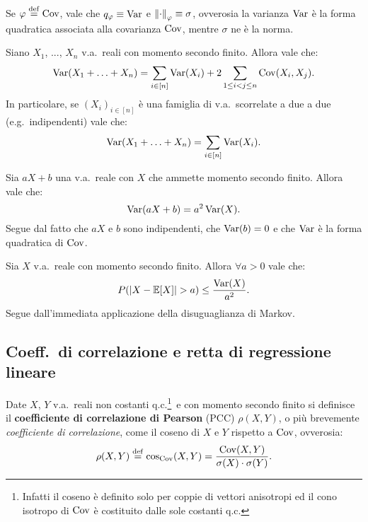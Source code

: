\begin{multicols*}{2}
\begin{remark}
    Se $\varphi \overset{\mathrm{def}}{=} \operatorname{Cov}$, vale che $q_\varphi \equiv \operatorname{Var}$ e $\left\lVert \cdot \right\rVert_\varphi \equiv \sigma$,
    ovverosia la varianza $\operatorname{Var}$ è la forma quadratica associata alla covarianza $\operatorname{Cov}$,
    mentre $\sigma$ ne è la norma.
\end{remark}

\begin{lemma}
    Siano $X_1$, ..., $X_n$ v.a.~reali con momento secondo finito. Allora vale che:
    \[
        \operatorname{Var}(X_1 + \ldots + X_n) = \sum_{i \in [n]} \operatorname{Var}(X_i) + 2 \sum_{1 \leq i < j \leq n} \operatorname{Cov}(X_i, X_j).
    \]
    In particolare, se $(X_i)_{i \in [n]}$ è una famiglia di v.a.~scorrelate a due a due (e.g.~indipendenti) vale che:
    \[
        \operatorname{Var}(X_1 + \ldots + X_n) = \sum_{i \in [n]} \operatorname{Var}(X_i).
    \]
\end{lemma}

\begin{lemma}
    Sia $aX + b$ una v.a.~reale con $X$ che ammette momento secondo finito. Allora
    vale che:
    \[
        \operatorname{Var}(aX + b) = a^2 \operatorname{Var}(X).
    \]
    Segue dal fatto che $aX$ e $b$ sono indipendenti, che $\operatorname{Var}(b) = 0$ e che
    $\operatorname{Var}$ è la forma quadratica di $\operatorname{Cov}$.
\end{lemma}

\begin{proposition}
    Sia $X$ v.a.~reale con momento secondo finito. Allora $\forall a > 0$ vale
    che:
    \[
        P(\left\lvert X - \mathbb{E}[X] \right\rvert > a) \leq \frac{\operatorname{Var}(X)}{a^2}.
    \]
    Segue dall'immediata applicazione della disuguaglianza di Markov.
\end{proposition}

\subsection{Coeff.~di correlazione e retta di regressione lineare}

\begin{definition}
    Date $X$, $Y$ v.a.~reali non costanti q.c.\footnote{
        Infatti il coseno è definito solo per coppie di vettori anisotropi
        ed il cono isotropo di $\operatorname{Cov}$ è costituito dalle sole costanti q.c.
    }~e con momento secondo finito si definisce il \textbf{coefficiente di correlazione
    di Pearson} (PCC) $\rho(X, Y)$, o più brevemente \textit{coefficiente di correlazione}, 
     come il coseno di $X$ e $Y$ rispetto a $\operatorname{Cov}$, ovverosia:
    \[
        \rho(X, Y) \overset{\mathrm{def}}{=} \cos_{\operatorname{Cov}}(X, Y) = \frac{\operatorname{Cov}(X, Y)}{\sigma(X) \cdot \sigma(Y)}.
    \]
\end{definition}


\end{multicols*}
